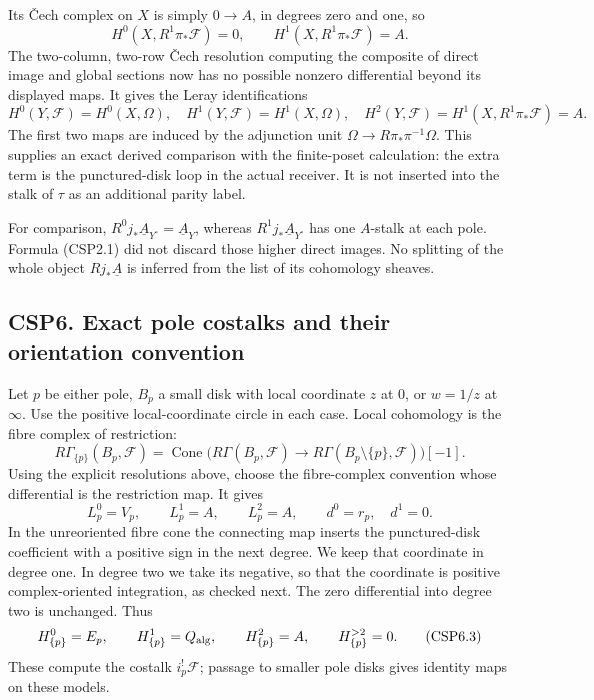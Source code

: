 Its Čech complex on \(X\) is simply \(0\to A\), in degrees zero and one,
so \[
H^0(X,R^1\pi_*\mathscr F)=0,\qquad
H^1(X,R^1\pi_*\mathscr F)=A.
\tag{CSP5.2}
\] The two-column, two-row Čech resolution computing the composite of
direct image and global sections now has no possible nonzero
differential beyond its displayed maps. It gives the Leray
identifications \[
H^0(Y,\mathscr F)=H^0(X,\Omega),\quad
H^1(Y,\mathscr F)=H^1(X,\Omega),\quad
H^2(Y,\mathscr F)=H^1(X,R^1\pi_*\mathscr F)=A.
\tag{CSP5.3}
\] The first two maps are induced by the adjunction unit
\(\Omega\to R\pi_*\pi^{-1}\Omega\). This supplies an exact derived
comparison with the finite-poset calculation: the extra term is the
punctured-disk loop in the actual receiver. It is not inserted into the
stalk of \(\tau\) as an additional parity label.

For comparison, \(R^0j_*\underline A_{Y^\circ}=\underline A_Y\), whereas
\(R^1j_*\underline A_{Y^\circ}\) has one \(A\)-stalk at each pole.
Formula (CSP2.1) did not discard those higher direct images. No
splitting of the whole object \(Rj_*\underline A\) is inferred from the
list of its cohomology sheaves.

\subsection{CSP6. Exact pole costalks and their orientation
convention}\label{csp6.-exact-pole-costalks-and-their-orientation-convention}

Let \(p\) be either pole, \(B_p\) a small disk with local coordinate
\(z\) at \(0\), or \(w=1/z\) at \(\infty\). Use the positive
local-coordinate circle in each case. Local cohomology is the fibre
complex of restriction: \[
R\Gamma_{\{p\}}(B_p,\mathscr F)
=\operatorname{Cone}\bigl(R\Gamma(B_p,\mathscr F)
\to R\Gamma(B_p\setminus\{p\},\mathscr F)\bigr)[-1].
\tag{CSP6.1}
\] Using the explicit resolutions above, choose the fibre-complex
convention whose differential is the restriction map. It gives \[
L_p^0=V_p,\qquad L_p^1=A,\qquad L_p^2=A,
\qquad d^0=r_p,\quad d^1=0.
\tag{CSP6.2}
\] In the unreoriented fibre cone the connecting map inserts the
punctured-disk coefficient with a positive sign in the next degree. We
keep that coordinate in degree one. In degree two we take its negative,
so that the coordinate is positive complex-oriented integration, as
checked next. The zero differential into degree two is unchanged. Thus
\[
H^0_{\{p\}}=E_p,\qquad
H^1_{\{p\}}=Q_{\rm alg},\qquad
H^2_{\{p\}}=A,\qquad H^{>2}_{\{p\}}=0.
\tag{CSP6.3}
\] These compute the costalk \(i_p^!\mathscr F\); passage to smaller
pole disks gives identity maps on these models.

